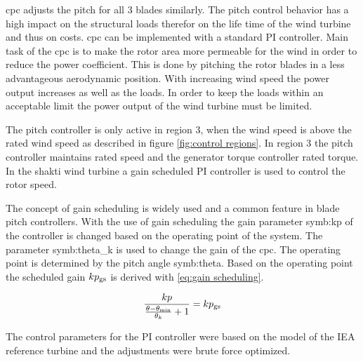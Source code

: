 \gls{cpc} adjusts the pitch for all 3 blades similarly.
The pitch control behavior has a high impact on the structural loads therefor on the life time of the wind turbine and thus on costs.
\gls{cpc} can be implemented with a standard PI controller.
Main task of the \gls{cpc} is to make the rotor area more permeable for the wind in order to reduce the power coefficient.
This is done by pitching the rotor blades in a less advantageous aerodynamic position.
With increasing wind speed the power output increases as well as the loads.
In order to keep the loads within an acceptable limit the power output of the wind turbine must be limited.

The pitch controller is only active in region 3, when the wind speed is above the rated wind speed as described in figure \ref{fig:control regions}.
In region 3 the pitch controller maintains rated speed and the generator torque controller rated torque. \cite{SchlipfLecture}
In the \gls{shakti} wind turbine a gain scheduled PI controller is used to control the rotor speed. 

The concept of gain scheduling is widely used and a common feature in blade pitch controllers.
With the use of gain scheduling the gain parameter \gls{symb:kp} of the controller is changed based on the operating point of the system.
The parameter \gls{symb:theta_k} is used to change the gain of the \gls{cpc}.
The operating point is determined by the pitch angle \gls{symb:theta}. Based on the operating point the scheduled gain $kp_\textnormal{gs}$ is derived with \ref{eq:gain scheduling}.

\begin{equation}
	\frac{kp}{\frac{\theta - \theta_\textnormal{min}}{\theta_k} + 1} = kp_\textnormal{gs}
	\label{eq:gain scheduling}
\end{equation}

The control parameters for the PI controller were based on the model of the IEA reference turbine \cite{IEA} and the adjustments were brute force optimized.